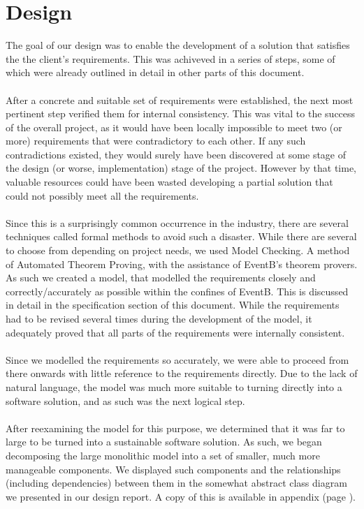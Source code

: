 \documentclass[a4paper]{article}
\begin{document}
\section{Design}
The goal of our design was to enable the development of a solution that satisfies the the client’s requirements. This was achiveved in a series of steps, some of which were already outlined in detail in other parts of this document.
\\\\
After a concrete and suitable set of requirements were established, the next most pertinent step verified them for internal consistency. This was vital to the success of the overall project, as it would have been locally impossible to meet two (or more) requirements that were contradictory to each other. If any such contradictions existed, they would surely have been discovered at some stage of the design (or worse, implementation) stage of the project. However by that time, valuable resources could have been wasted developing a partial solution that could not possibly meet all the requirements.
\\\\
Since this is a surprisingly common occurrence in the industry, there are several techniques called formal methods to avoid such a disaster. While there are several to choose from depending on project needs, we used Model Checking. A method of Automated Theorem Proving, with the assistance of EventB’s theorem provers. As such we created a model, that modelled the requirements closely and correctly/accurately as possible within the confines of EventB. This is discussed in detail in the specification section  of this document. While the requirements had to be revised several times during the development of the model, it adequately proved that all parts of the requirements were internally consistent.
\\\\
Since we modelled the requirements so accurately, we were able to proceed from there onwards with little reference to the requirements directly. Due to the lack of natural language, the model was much more suitable to turning directly into a software solution, and as such was the next logical step. 
\\\\
After reexamining the model for this purpose, we determined that it was far to large to be turned into a sustainable software solution. As such, we began decomposing the large monolithic model into a set of smaller, much more manageable components. We displayed such components and the relationships (including dependencies) between them in the somewhat abstract class diagram we presented in our design report. A copy of this is available in appendix (page ). 
\end{document}
